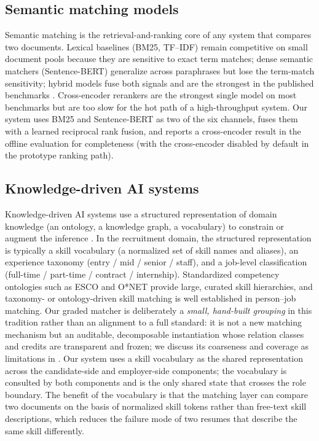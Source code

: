 \subsection{Semantic matching models}
Semantic matching is the retrieval-and-ranking core of any system that compares two documents.
Lexical baselines (BM25, TF--IDF) \citep{robertson1995okapi} remain competitive on small document pools because they are sensitive to exact term matches; dense semantic matchers (Sentence-BERT) \citep{reimers2019sentence} generalize across paraphrases but lose the term-match sensitivity; hybrid models fuse both signals and are the strongest in the published benchmarks \citep{cormack2010reciprocal}.
Cross-encoder rerankers are the strongest single model on most benchmarks but are too slow for the hot path of a high-throughput system.
Our system uses BM25 and Sentence-BERT as two of the six channels, fuses them with a learned reciprocal rank fusion, and reports a cross-encoder result in the offline evaluation for completeness (with the cross-encoder disabled by default in the prototype ranking path).

\subsection{Knowledge-driven AI systems}
Knowledge-driven AI systems use a structured representation of domain knowledge (an ontology, a knowledge graph, a vocabulary) to constrain or augment the inference \citep{nikolakopoulos2023knowledge,gentile2014feature}.
In the recruitment domain, the structured representation is typically a skill vocabulary (a normalized set of skill names and aliases), an experience taxonomy (entry / mid / senior / staff), and a job-level classification (full-time / part-time / contract / internship). Standardized competency ontologies such as ESCO \citep{esco2017} and O*NET \citep{onet2024} provide large, curated skill hierarchies, and taxonomy- or ontology-driven skill matching is well established in person--job matching. Our graded matcher is deliberately a \emph{small, hand-built grouping} in this tradition rather than an alignment to a full standard: it is not a new matching mechanism but an auditable, decomposable instantiation whose relation classes and credits are transparent and frozen; we discuss its coarseness and coverage as limitations in .
Our system uses a skill vocabulary as the shared representation across the candidate-side and employer-side components; the vocabulary is consulted by both components and is the only shared state that crosses the role boundary.
The benefit of the vocabulary is that the matching layer can compare two documents on the basis of normalized skill tokens rather than free-text skill descriptions, which reduces the failure mode of two resumes that describe the same skill differently.

